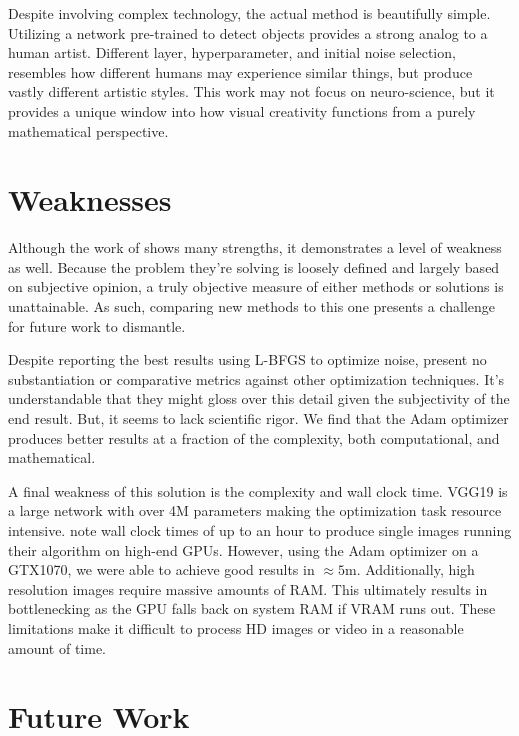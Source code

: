 \documentclass{article}
\begin{document}
Despite involving complex technology, the actual method is beautifully simple.
Utilizing a network pre-trained to detect objects provides a strong analog to
a human artist. Different layer, hyperparameter, and initial noise selection,
resembles how different humans may experience similar things, but produce
vastly different artistic styles. This work may not focus on neuro-science,
but it provides a unique window into how visual creativity functions from a
purely mathematical perspective.



\section{Weaknesses}

Although the work of \cite{2015arXiv150806576G} shows many strengths, it
demonstrates a level of weakness as well. Because the problem they're solving
is loosely defined and largely based on subjective opinion, a truly objective
measure of either methods or solutions is unattainable. As such, comparing new
methods to this one presents a challenge for future work to dismantle.

Despite reporting the best results using L-BFGS to optimize noise,
\cite{2015arXiv150806576G} present no substantiation or comparative metrics
against other optimization techniques. It's understandable that they might
gloss over this detail given the subjectivity of the end result. But, it
seems to lack scientific rigor. We find that the Adam optimizer produces
better results at a fraction of the complexity, both computational, and
mathematical.

A final weakness of this solution is the complexity and wall clock time.
VGG19 is a large network with over 4M parameters making the optimization task
resource intensive. \cite{2015arXiv150806576G} note wall clock times of up to
an hour to produce single images running their algorithm on high-end GPUs.
However, using the Adam optimizer on a GTX1070, we were able to achieve good
results in $\approx 5$m. Additionally, high resolution images require
massive amounts of RAM. This ultimately results in bottlenecking as the GPU
falls back on system RAM if VRAM runs out. These limitations make it difficult
to process HD images or video in a reasonable amount of time.



\section{Future Work}
\end{document}

